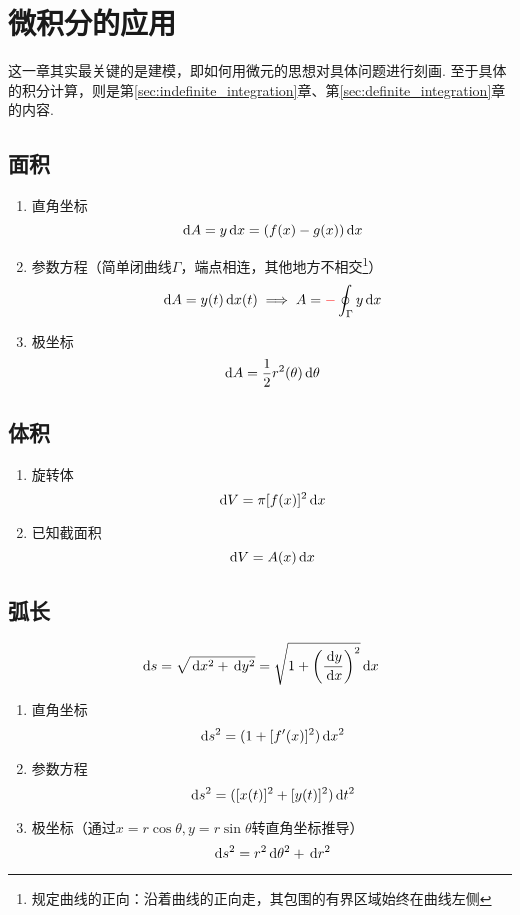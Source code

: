 
\section{微积分的应用}
这一章其实最关键的是建模，即如何用微元的思想对具体问题进行刻画. 至于具体的积分计算，则是第\ref{sec:indefinite_integration}章、第\ref{sec:definite_integration}章的内容.
\subsection{面积}
\begin{enumerate}
	\item 直角坐标
	\[\,\mathrm{d} A=y\,\mathrm{d} x=(f(x)-g(x))\,\mathrm{d} x\]
	\item 参数方程（简单闭曲线$\Gamma$，端点相连，其他地方不相交\footnote{规定曲线的正向：沿着曲线的正向走，其包围的有界区域始终在曲线左侧}）
	\[\,\mathrm{d} A=y(t)\,\mathrm{d} x(t)\implies A=\textcolor{red}{-}\oint_\Gamma y\,\mathrm{d} x\]
	\item 极坐标
	\[\,\mathrm{d} A=\dfrac{1}{2}r^2(\theta)\,\mathrm{d}\theta\]
\end{enumerate}

\subsection{体积}
\begin{enumerate}
	\item 旋转体
\[\,\mathrm{d} V=\pi[f(x)]^2\,\mathrm{d} x\]
	\item 已知截面积
\[\,\mathrm{d} V=A(x)\,\mathrm{d} x\]
\end{enumerate}

\subsection{弧长}
\begin{center}
\end{center}
\[\,\mathrm{d} s=\sqrt{\,\mathrm{d} x^2+\,\mathrm{d} y^2}=\sqrt{1+\left(\dfrac{\,\mathrm{d} y}{\,\mathrm{d} x}\right)^2}\,\mathrm{d} x\]
\begin{enumerate}
	\item 直角坐标
	\[\,\mathrm{d} s^2=(1+[f'(x)]^2)\,\mathrm{d} x^2\]
	\item 参数方程
	\[\,\mathrm{d} s^2=([x(t)]^2+[y(t)]^2)\,\mathrm{d} t^2\]
	\item 极坐标（通过$x=r\cos\theta,y=r\sin\theta$转直角坐标推导）
	\[\,\mathrm{d} s^2=r^2\,\mathrm{d}\theta^2+\,\mathrm{d} r^2\]
\end{enumerate}


